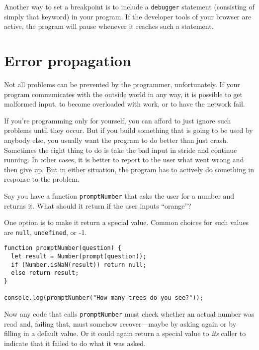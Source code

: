 Another way to set a breakpoint is to include a \lstinline`debugger` statement (consisting of simply that keyword) in your program. If the developer tools of your browser are active, the program will pause whenever it reaches such a statement.

\section{Error propagation}

Not all problems can be prevented by the programmer, unfortunately. If your program communicates with the outside world in any way, it is possible to get malformed input, to become overloaded with work, or to have the network fail.

If you're programming only for yourself, you can afford to just ignore such problems until they occur. But if you build something that is going to be used by anybody else, you usually want the program to do better than just crash. Sometimes the right thing to do is take the bad input in stride and continue running. In other cases, it is better to report to the user what went wrong and then give up. But in either situation, the program has to actively do something in response to the problem.

Say you have a function \lstinline`promptNumber` that asks the user for a number and returns it. What should it return if the user inputs ``orange''?

One option is to make it return a special value. Common choices for such values are \lstinline`null`, \lstinline`undefined`, or -1.

\begin{lstlisting}
function promptNumber(question) {
  let result = Number(prompt(question));
  if (Number.isNaN(result)) return null;
  else return result;
}

console.log(promptNumber("How many trees do you see?"));
\end{lstlisting}
\noindent

Now any code that calls \lstinline`promptNumber` must check whether an actual number was read and, failing that, must somehow recover—maybe by asking again or by filling in a default value. Or it could again return a special value to \emph{its} caller to indicate that it failed to do what it was asked.

